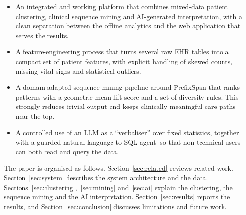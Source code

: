 \begin{itemize}
  \item An integrated and working platform that combines mixed-data patient clustering, clinical sequence mining and AI-generated interpretation, with a clean separation between the offline analytics and the web application that serves the results.
  \item A feature-engineering process that turns several raw EHR tables into a compact set of patient features, with explicit handling of skewed counts, missing vital signs and statistical outliers.
  \item A domain-adapted sequence-mining pipeline around PrefixSpan that ranks patterns with a geometric mean lift score and a set of diversity rules. This strongly reduces trivial output and keeps clinically meaningful care paths near the top.
  \item A controlled use of an LLM as a ``verbaliser'' over fixed statistics, together with a guarded natural-language-to-SQL agent, so that non-technical users can both read and query the data.
\end{itemize}

The paper is organised as follows. Section~\ref{sec:related} reviews related work. Section~\ref{sec:system} describes the system architecture and the data. Sections~\ref{sec:clustering},~\ref{sec:mining} and~\ref{sec:ai} explain the clustering, the sequence mining and the AI interpretation. Section~\ref{sec:results} reports the results, and Section~\ref{sec:conclusion} discusses limitations and future work.
